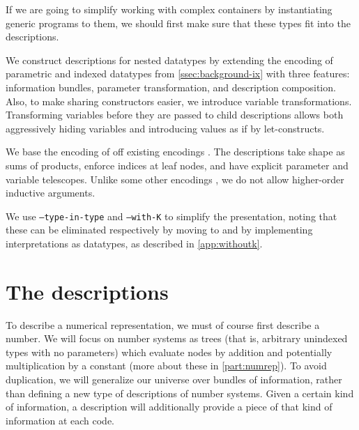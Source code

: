 

If we are going to simplify working with complex containers %
by instantiating generic programs to them, we should first make sure that these types fit into the descriptions.

We construct descriptions for nested datatypes by extending the encoding of parametric and indexed datatypes from \autoref{ssec:background-ix} with three features: information bundles, parameter transformation, and description composition. Also, to make sharing constructors easier, we introduce variable transformations. Transforming variables before they are passed to child descriptions allows both aggressively hiding variables and introducing values as if by let-constructs.

We base the encoding of off existing encodings \cite{sijsling,practgen}. The descriptions take shape as sums of products, enforce indices at leaf nodes, and have explicit parameter and variable telescopes. Unlike some other encodings \cite{effectfully, practgen}, we do not allow higher-order inductive arguments. 

We use \texttt{--type-in-type} and \texttt{--with-K} to simplify the presentation, noting that these can be eliminated respectively by moving to  and by implementing interpretations as datatypes, as described in \autoref{app:withoutk}.



\section{The descriptions}\label{ssec:desc}
To describe a numerical representation, we must of course first describe a number. We will focus on number systems as trees (that is, arbitrary unindexed types with no parameters) which evaluate nodes by addition and potentially multiplication by a constant (more about these in \autoref{part:numrep}). To avoid duplication, we will generalize our universe over bundles of information, rather than defining a new type of descriptions of number systems. Given a certain kind of information, a description will additionally provide a piece of that kind of information at each code. %

